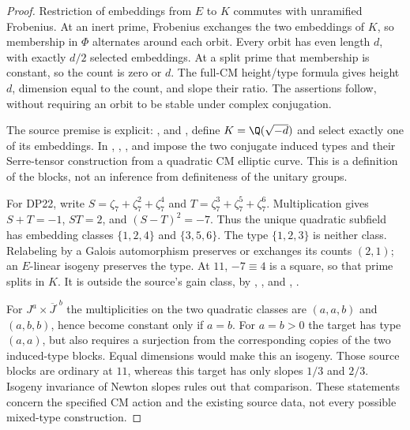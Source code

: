 \begin{proof}
Restriction of embeddings from $E$ to $K$ commutes with unramified Frobenius. At an inert prime, Frobenius exchanges the two embeddings of $K$, so membership in $\Phi$ alternates around each orbit. Every orbit has even length $d$, with exactly $d/2$ selected embeddings. At a split prime that membership is constant, so the count is zero or $d$. The full-CM height/type formula \cite[\S5, (10*) and Theorem 3]{Tate352} gives height $d$, dimension equal to the count, and slope their ratio. The assertions follow, without requiring an orbit to be stable under complex conjugation.

The source premise is explicit: ,  and , define $K=\Q(\sqrt{-d})$ and select exactly one of its embeddings. In , , , and  impose the two conjugate induced types and their Serre-tensor construction from a quadratic CM elliptic curve. This is a definition of the blocks, not an inference from definiteness of the unitary groups.

For DP22, write $S=\zeta_7+\zeta_7^2+\zeta_7^4$ and $T=\zeta_7^3+\zeta_7^5+\zeta_7^6$. Multiplication gives $S+T=-1$, $ST=2$, and $(S-T)^2=-7$. Thus the unique quadratic subfield has embedding classes $\{1,2,4\}$ and $\{3,5,6\}$. The type $\{1,2,3\}$ is neither class. Relabeling by a Galois automorphism preserves or exchanges its counts $(2,1)$; an $E$-linear isogeny preserves the type. At $11$, $-7\equiv4$ is a square, so that prime splits in $K$. It is outside the source's  gain class, by , , and , .

For $J^a\times\overline J^{,b}$ the multiplicities on the two quadratic classes are $(a,a,b)$ and $(a,b,b)$, hence become constant only if $a=b$. For $a=b>0$ the target has type $(a,a)$, but  also requires a surjection from the corresponding copies of the two induced-type blocks. Equal dimensions would make this an isogeny. Those source blocks are ordinary at $11$, whereas this target has only slopes $1/3$ and $2/3$. Isogeny invariance of Newton slopes rules out that comparison. These statements concern the specified CM action and the existing source data, not every possible mixed-type construction.
\end{proof}
